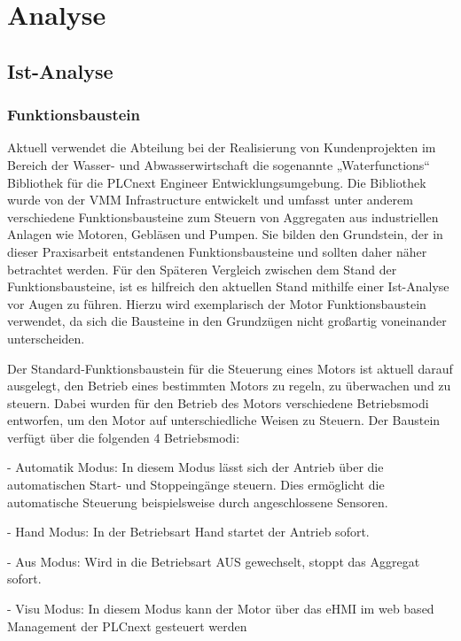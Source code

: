 \section{Analyse}
\subsection{Ist-Analyse}
\subsubsection{Funktionsbaustein}
Aktuell verwendet die Abteilung bei der Realisierung von Kundenprojekten im Bereich der Wasser- und Abwasserwirtschaft die sogenannte „Waterfunctions“ Bibliothek für die PLCnext Engineer Entwicklungsumgebung. Die Bibliothek wurde von der VMM Infrastructure entwickelt und umfasst unter anderem verschiedene Funktionsbausteine zum Steuern von Aggregaten aus industriellen Anlagen wie Motoren, Gebläsen und Pumpen. Sie bilden den Grundstein, der in dieser Praxisarbeit entstandenen Funktionsbausteine und sollten daher näher betrachtet werden.
Für den Späteren Vergleich zwischen dem Stand der Funktionsbausteine, ist es hilfreich den aktuellen Stand mithilfe einer Ist-Analyse vor Augen zu führen. Hierzu wird exemplarisch der Motor Funktionsbaustein verwendet, da sich die Bausteine in den Grundzügen nicht großartig voneinander unterscheiden.

Der Standard-Funktionsbaustein für die Steuerung eines Motors ist aktuell darauf ausgelegt, den Betrieb eines bestimmten Motors zu regeln, zu überwachen und zu steuern. Dabei wurden für den Betrieb des Motors verschiedene Betriebsmodi entworfen, um den Motor auf unterschiedliche Weisen zu Steuern. Der Baustein verfügt über die folgenden 4 Betriebsmodi:

-	Automatik Modus: In diesem Modus lässt sich der Antrieb über die automatischen Start- und Stoppeingänge steuern. Dies ermöglicht die automatische Steuerung beispielsweise durch angeschlossene Sensoren. 

-	Hand Modus: In der Betriebsart Hand startet der Antrieb sofort.

-	Aus Modus: Wird in die Betriebsart AUS gewechselt, stoppt das Aggregat sofort.

-	Visu Modus: In diesem Modus kann der Motor über das eHMI im web based Management der PLCnext gesteuert werden

